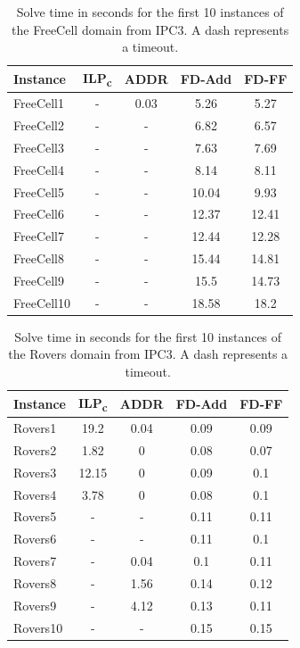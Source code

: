 \begin{table}[p]
    \centering
    \begin{tabular}{lcccc}
        \hline
        \textbf{Instance} & \textbf{ILP\textsubscript{c}} & \textbf{ADDR} & \textbf{FD-Add} & \textbf{FD-FF} \\ 
        \hline
        FreeCell1 & - & 0.03 & 5.26 & 5.27\\ 
        FreeCell2 & - & - & 6.82 & 6.57\\ 
        FreeCell3 & - & - & 7.63 & 7.69 \\ 
        FreeCell4 & - & - & 8.14 & 8.11\\ 
        FreeCell5 & - & - & 10.04 & 9.93  \\ 
        FreeCell6 & - & - & 12.37 & 12.41\\ 
        FreeCell7 & - & - & 12.44 & 12.28  \\ 
        FreeCell8 & - & - & 15.44 & 14.81 \\ 
        FreeCell9 & - & - & 15.5 & 14.73 \\ 
        FreeCell10 & - & - & 18.58 & 18.2\\ 
        \hline
    \end{tabular}
    \caption{Solve time in seconds for the first 10 instances of the FreeCell domain from IPC3. A dash represents a timeout.}
    \label{fig:freeCellTime}
\end{table}


\begin{table}[p]
    \centering
    \begin{tabular}{lcccc}
        \hline
        \textbf{Instance} & \textbf{ILP\textsubscript{c}} & \textbf{ADDR} & \textbf{FD-Add} & \textbf{FD-FF} \\ 
        \hline
        Rovers1 & 19.2 & 0.04 & 0.09 & 0.09\\ 
        Rovers2 & 1.82 & 0 & 0.08 & 0.07\\ 
        Rovers3 & 12.15 & 0 & 0.09 & 0.1\\ 
        Rovers4 & 3.78 & 0 & 0.08 & 0.1\\ 
        Rovers5 & - & - & 0.11 & 0.11\\ 
        Rovers6 & - & - & 0.11 & 0.1\\ 
        Rovers7 & - & 0.04 & 0.1 & 0.11 \\ 
        Rovers8 & - & 1.56 & 0.14 & 0.12\\ 
        Rovers9 & - & 4.12 & 0.13 & 0.11\\ 
        Rovers10 & - & - & 0.15 & 0.15\\ 
        \hline
    \end{tabular}
    \caption{Solve time in seconds for the first 10 instances of the Rovers domain from IPC3. A dash represents a timeout.}
    \label{fig:roversTime}
\end{table}


